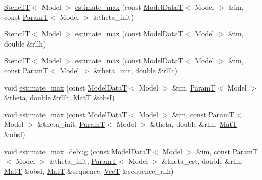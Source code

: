 \begin{DoxyCompactItemize}
\hyperlink{namespacemappel_a3a06598240007876f8c4bf834ad86197}{StencilT}$<$ Model $>$ \hyperlink{classmappel_1_1Estimator_aa8aa62047bfc28b1df3a9261da4f38a1}{estimate\+\_\+max} (const \hyperlink{namespacemappel_a97f050df953605381ae9c901c3b125f1}{Model\+DataT}$<$ Model $>$ \&im, const \hyperlink{namespacemappel_a667925cb0d6c0e49f2f035cc5a9a6857}{ParamT}$<$ Model $>$ \&theta\+\_\+init)
\item 
\hyperlink{namespacemappel_a3a06598240007876f8c4bf834ad86197}{StencilT}$<$ Model $>$ \hyperlink{classmappel_1_1Estimator_ab1be1fb34a71f9a46700c9d455fd5daf}{estimate\+\_\+max} (const \hyperlink{namespacemappel_a97f050df953605381ae9c901c3b125f1}{Model\+DataT}$<$ Model $>$ \&im, double \&rllh)
\item 
\hyperlink{namespacemappel_a3a06598240007876f8c4bf834ad86197}{StencilT}$<$ Model $>$ \hyperlink{classmappel_1_1Estimator_a2544f56248cb0f0763c964ddfaad32cc}{estimate\+\_\+max} (const \hyperlink{namespacemappel_a97f050df953605381ae9c901c3b125f1}{Model\+DataT}$<$ Model $>$ \&im, const \hyperlink{namespacemappel_a667925cb0d6c0e49f2f035cc5a9a6857}{ParamT}$<$ Model $>$ \&theta\+\_\+init, double \&rllh)
\item 
void \hyperlink{classmappel_1_1Estimator_a79f2d1c46789fed681985bb670e5ca37}{estimate\+\_\+max} (const \hyperlink{namespacemappel_a97f050df953605381ae9c901c3b125f1}{Model\+DataT}$<$ Model $>$ \&im, \hyperlink{namespacemappel_a667925cb0d6c0e49f2f035cc5a9a6857}{ParamT}$<$ Model $>$ \&theta, double \&rllh, \hyperlink{namespacemappel_a7091ab87c528041f7e2027195fad8915}{MatT} \&obsI)
\item 
void \hyperlink{classmappel_1_1Estimator_a8f85cf26c72c34d0071ccd2f8bb56abd}{estimate\+\_\+max} (const \hyperlink{namespacemappel_a97f050df953605381ae9c901c3b125f1}{Model\+DataT}$<$ Model $>$ \&im, const \hyperlink{namespacemappel_a667925cb0d6c0e49f2f035cc5a9a6857}{ParamT}$<$ Model $>$ \&theta\+\_\+init, \hyperlink{namespacemappel_a667925cb0d6c0e49f2f035cc5a9a6857}{ParamT}$<$ Model $>$ \&theta, double \&rllh, \hyperlink{namespacemappel_a7091ab87c528041f7e2027195fad8915}{MatT} \&obsI)
\item 
void \hyperlink{classmappel_1_1Estimator_a4a581372a320f1c13eeffacf6309911b}{estimate\+\_\+max\+\_\+debug} (const \hyperlink{namespacemappel_a97f050df953605381ae9c901c3b125f1}{Model\+DataT}$<$ Model $>$ \&im, const \hyperlink{namespacemappel_a667925cb0d6c0e49f2f035cc5a9a6857}{ParamT}$<$ Model $>$ \&theta\+\_\+init, \hyperlink{namespacemappel_a667925cb0d6c0e49f2f035cc5a9a6857}{ParamT}$<$ Model $>$ \&theta\+\_\+est, double \&rllh, \hyperlink{namespacemappel_a7091ab87c528041f7e2027195fad8915}{MatT} \&obsI, \hyperlink{namespacemappel_a7091ab87c528041f7e2027195fad8915}{MatT} \&sequence, \hyperlink{namespacemappel_a2225ad69f358daa3f4f99282a35b9a3a}{VecT} \&sequence\+\_\+rllh)
\end{DoxyCompactItemize}
